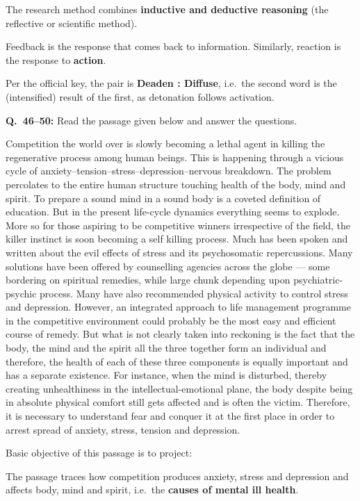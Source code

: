 The research method combines \textbf{inductive and deductive reasoning} (the reflective or scientific method).

Feedback is the response that comes back to information. Similarly, reaction is the response to \textbf{action}.

Per the official key, the pair is \textbf{Deaden : Diffuse}, i.e.\ the second word is the (intensified) result of the first, as detonation follows activation.

\textbf{Q.~46--50:} Read the passage given below and answer the questions.\par\smallskip
Competition the world over is slowly becoming a lethal agent in killing the regenerative process among human beings. This is happening through a vicious cycle of anxiety--tension--stress--depression--nervous breakdown. The problem percolates to the entire human structure touching health of the body, mind and spirit. To prepare a sound mind in a sound body is a coveted definition of education. But in the present life-cycle dynamics everything seems to explode. More so for those aspiring to be competitive winners irrespective of the field, the killer instinct is soon becoming a self killing process. Much has been spoken and written about the evil effects of stress and its psychosomatic repercussions. Many solutions have been offered by counselling agencies across the globe --- some bordering on spiritual remedies, while large chunk depending upon psychiatric-psychic process. Many have also recommended physical activity to control stress and depression. However, an integrated approach to life management programme in the competitive environment could probably be the most easy and efficient course of remedy. But what is not clearly taken into reckoning is the fact that the body, the mind and the spirit all the three together form an individual and therefore, the health of each of these three components is equally important and has a separate existence. For instance, when the mind is disturbed, thereby creating unhealthiness in the intellectual-emotional plane, the body despite being in absolute physical comfort still gets affected and is often the victim. Therefore, it is necessary to understand fear and conquer it at the first place in order to arrest spread of anxiety, stress, tension and depression.

Basic objective of this passage is to project:

The passage traces how competition produces anxiety, stress and depression and affects body, mind and spirit, i.e.\ the \textbf{causes of mental ill health}.

